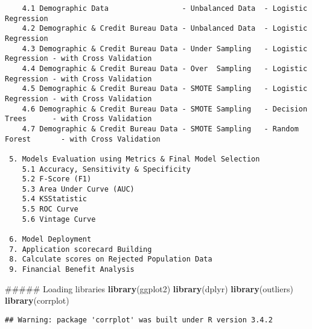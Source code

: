 \documentclass[]{article}
\newenvironment{Shaded}{\begin{snugshade}}{\end{snugshade}}
\newcommand{\KeywordTok}[1]{\textcolor[rgb]{0.13,0.29,0.53}{\textbf{{#1}}}}
\newcommand{\NormalTok}[1]{{#1}}
\begin{document}
\begin{verbatim}
    4.1 Demographic Data                 - Unbalanced Data  - Logistic Regression 
    4.2 Demographic & Credit Bureau Data - Unbalanced Data  - Logistic Regression
    4.3 Demographic & Credit Bureau Data - Under Sampling   - Logistic Regression - with Cross Validation
    4.4 Demographic & Credit Bureau Data - Over  Sampling   - Logistic Regression - with Cross Validation 
    4.5 Demographic & Credit Bureau Data - SMOTE Sampling   - Logistic Regression - with Cross Validation
    4.6 Demographic & Credit Bureau Data - SMOTE Sampling   - Decision Trees      - with Cross Validation
    4.7 Demographic & Credit Bureau Data - SMOTE Sampling   - Random Forest       - with Cross Validation

 5. Models Evaluation using Metrics & Final Model Selection                                                                                                                                                                   
    5.1 Accuracy, Sensitivity & Specificity
    5.2 F-Score (F1)
    5.3 Area Under Curve (AUC)
    5.4 KSStatistic
    5.5 ROC Curve
    5.6 Vintage Curve

 6. Model Deployment                                                                                                                                                                            
 7. Application scorecard Building                                                                                                                                                              
 8. Calculate scores on Rejected Population Data                                                                                                                                                                   
 9. Financial Benefit Analysis                                                                                                                                                                     
\end{verbatim}

\begin{Shaded}
\begin{Highlighting}[]
\NormalTok{##### Loading libraries}
\KeywordTok{library}\NormalTok{(ggplot2)}
\KeywordTok{library}\NormalTok{(dplyr)}
\KeywordTok{library}\NormalTok{(outliers)}
\KeywordTok{library}\NormalTok{(corrplot)}
\end{Highlighting}
\end{Shaded}

\begin{verbatim}
## Warning: package 'corrplot' was built under R version 3.4.2
\end{verbatim}
\end{document}
